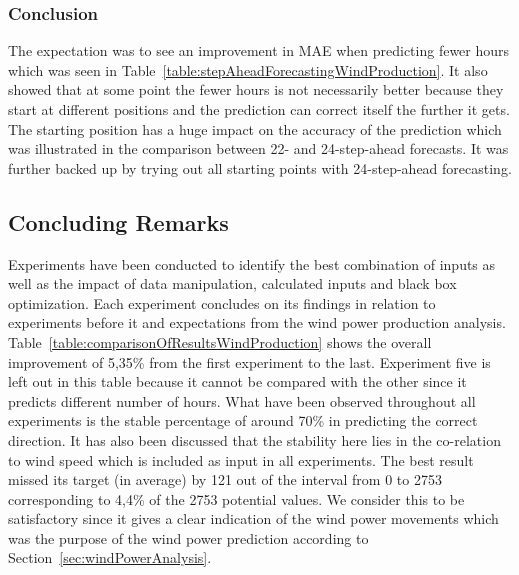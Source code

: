 \subsubsection{Conclusion}
The expectation was to see an improvement in MAE when predicting fewer hours which was seen in Table~\ref{table:stepAheadForecastingWindProduction}. It also showed that at some point the fewer hours is not necessarily better because they start at different positions and the prediction can correct itself the further it gets. The starting position has a huge impact on the accuracy of the prediction which was illustrated in the comparison between 22- and 24-step-ahead forecasts. It was further backed up by trying out all starting points with 24-step-ahead forecasting.

\subsection{Concluding Remarks}
Experiments have been conducted to identify the best combination of inputs as well as the impact of data manipulation, calculated inputs and black box optimization. Each experiment concludes on its findings in relation to experiments before it and expectations from the wind power production analysis. Table~\ref{table:comparisonOfResultsWindProduction} shows the overall improvement of 5,35\% from the first experiment to the last. Experiment five is left out in this table because it cannot be compared with the other since it predicts different number of hours. What have been observed throughout all experiments is the stable percentage of around 70\% in predicting the correct direction. It has also been discussed that the stability here lies in the co-relation to wind speed which is included as input in all experiments. The best result missed its target (in average) by 121 out of the interval from 0 to 2753 corresponding to 4,4\% of the 2753 potential values. We consider this to be satisfactory since it gives a clear indication of the wind power movements which was the purpose of the wind power prediction according to Section~\ref{sec:windPowerAnalysis}. 

